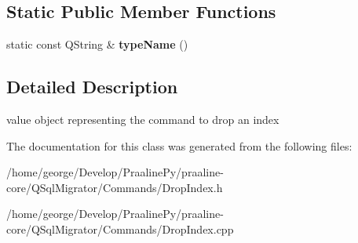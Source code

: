 \subsection*{Static Public Member Functions}
\begin{DoxyCompactItemize}
\item 
\mbox{\label{class_q_sql_migrator_1_1_commands_1_1_drop_index_af082e18d086ba9bfc9c914c32a1a8822}} 
static const Q\+String \& {\bfseries type\+Name} ()
\end{DoxyCompactItemize}


\subsection{Detailed Description}
value object representing the command to drop an index 

The documentation for this class was generated from the following files\+:\begin{DoxyCompactItemize}
\item 
/home/george/\+Develop/\+Praaline\+Py/praaline-\/core/\+Q\+Sql\+Migrator/\+Commands/Drop\+Index.\+h\item 
/home/george/\+Develop/\+Praaline\+Py/praaline-\/core/\+Q\+Sql\+Migrator/\+Commands/Drop\+Index.\+cpp\end{DoxyCompactItemize}
